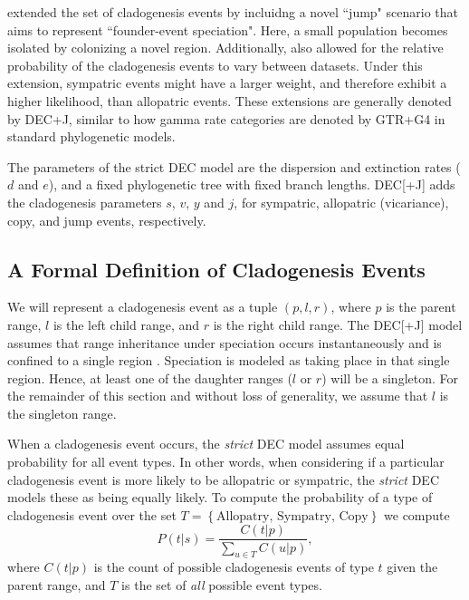 \documentclass[a4paper]{article}
\newcommand{\decj}{DEC[+J]}
\begin{document}
\citet{ModelSelectionMatzke2014} extended the set of cladogenesis events by incluidng a novel ``jump" scenario that 
aims to represent ``founder-event speciation".
Here, a small population becomes isolated by colonizing a novel region.
Additionally, \citet{ModelSelectionMatzke2014} also allowed for the relative probability of the cladogenesis events to
vary between datasets.
Under this extension, sympatric events might have a larger weight, and therefore exhibit a higher likelihood, than
allopatric events.
These extensions are generally denoted by DEC+J, similar to how gamma rate categories are denoted by GTR+G4 in
standard phylogenetic models.

The parameters of the strict DEC model are the dispersion and extinction rates ($d$ and $e$), and a fixed phylogenetic tree
with fixed branch lengths. 
\decj{} adds the cladogenesis parameters $s$, $v$, $y$ and $j$, for sympatric, allopatric (vicariance), copy, and jump
events, respectively.

\subsection{A Formal Definition of Cladogenesis Events}
\label{sec:formal-cladogenesis}

We will represent a cladogenesis event as a tuple $(p, l, r)$, where $p$ is the parent range, $l$ is the left child
range, and $r$ is the right child range.
The DEC[+J] model assumes that range inheritance under speciation occurs instantaneously and is confined to a single region .
Speciation is modeled as taking place in that single region.
Hence, at least one of the daughter ranges ($l$ or $r$) will be a singleton.
For the remainder of this section and without loss of generality, we assume that $l$ is the singleton range.

When a cladogenesis event occurs, the \textit{strict} DEC model assumes equal probability for all event types.
In other words, when considering if a particular cladogenesis event is more likely to be allopatric or sympatric,
the \textit{strict} DEC models these as being equally likely.
To compute the probability of a type of cladogenesis event over the set \(T = \left\{\text{Allopatry, Sympatry,
Copy}\right\}\) we compute
\[
	P(t |
	s) = \frac{C(t | p)}{\sum_{u \in T} C(u | p)},
\]
where \( C(t|p) \) is the count of possible cladogenesis events of type $t$ given the parent range, and $T$ is
the set of \textit{all} possible event types.
\end{document}
